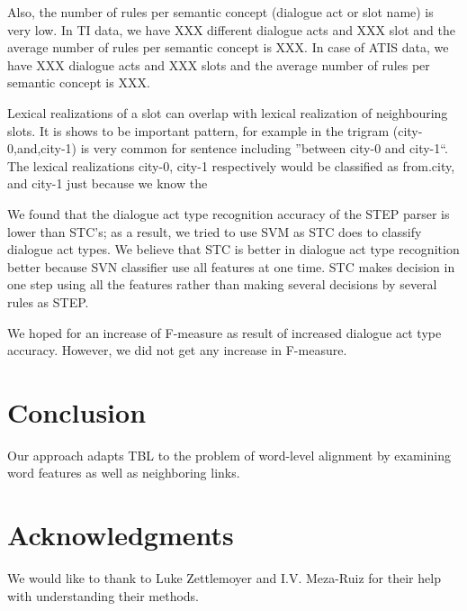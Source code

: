 \documentclass[11pt]{article}
\begin{document}
Also, the number of rules per semantic concept (dialogue act or slot name) is very low. In TI data, we have XXX different dialogue acts and XXX slot and the average number of rules per semantic concept is XXX. In case of ATIS data, we have XXX dialogue acts and XXX slots and the average number of rules per semantic concept is XXX.

Lexical realizations of a slot can overlap with lexical realization of neighbouring slots. It is shows to be important pattern, for example in the trigram (city-0,and,city-1) is very common for sentence including ''between city-0 and city-1``. The lexical realizations city-0, city-1 respectively would be classified as from.city, and city-1 just because we know the  


We found that the dialogue act type recognition accuracy of the STEP parser is lower than STC's; as a result, we tried to use SVM as STC does to classify dialogue act types. We believe that STC is better in dialogue act type recognition better because SVN classifier use all features at one time. STC makes decision in one step using all the features rather than making several decisions by several rules as STEP.

We hoped for an increase of F-measure as result of increased dialogue act type accuracy. However, we did not get any increase in F-measure.

\section{Conclusion}

Our approach adapts TBL to the problem of
word-level alignment by examining word features
as well as neighboring links.
 
\section*{Acknowledgments}

We would like to thank to Luke Zettlemoyer and I.V. Meza-Ruiz for their help with understanding their methods.
\end{document}
